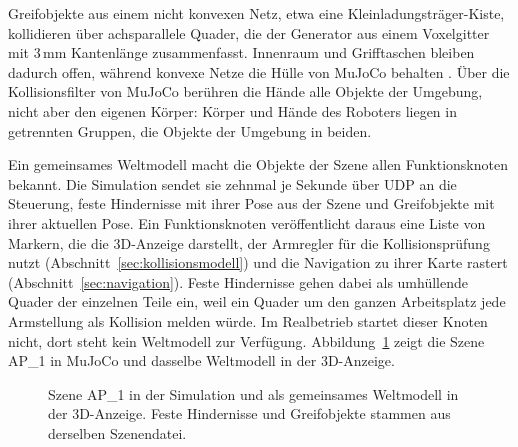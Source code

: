 Greifobjekte aus einem nicht konvexen Netz, etwa eine Kleinladungsträger-Kiste, kollidieren über achsparallele Quader, die der Generator aus einem Voxelgitter mit 3\,mm Kantenlänge zusammenfasst.
Innenraum und Grifftaschen bleiben dadurch offen, während konvexe Netze die Hülle von MuJoCo behalten .
Über die Kollisionsfilter von MuJoCo \cite{MujocoDoku2026} berühren die Hände alle Objekte der Umgebung, nicht aber den eigenen Körper: Körper und Hände des Roboters liegen in getrennten Gruppen, die Objekte der Umgebung in beiden.

Ein gemeinsames Weltmodell macht die Objekte der Szene allen Funktionsknoten bekannt.
Die Simulation sendet sie zehnmal je Sekunde über UDP an die Steuerung, feste Hindernisse mit ihrer Pose aus der Szene und Greifobjekte mit ihrer aktuellen Pose.
Ein Funktionsknoten veröffentlicht daraus eine Liste von Markern, die die 3D-Anzeige darstellt, der Armregler für die Kollisionsprüfung nutzt (Abschnitt~\ref{sec:kollisionsmodell}) und die Navigation zu ihrer Karte rastert (Abschnitt~\ref{sec:navigation}).
Feste Hindernisse gehen dabei als umhüllende Quader der einzelnen Teile ein, weil ein Quader um den ganzen Arbeitsplatz jede Armstellung als Kollision melden würde.
Im Realbetrieb startet dieser Knoten nicht, dort steht kein Weltmodell zur Verfügung.
Abbildung~\ref{fig:szene} zeigt die Szene AP\_1 in MuJoCo und dasselbe Weltmodell in der 3D-Anzeige.

\begin{figure}[htbp]
  \centering
  \caption[Szene eines Arbeitsplatzes in Simulation und 3D-Anzeige]{Szene AP\_1 in der Simulation und als gemeinsames Weltmodell in der 3D-Anzeige. Feste Hindernisse und Greifobjekte stammen aus derselben Szenendatei.}
  \label{fig:szene}
\end{figure}

